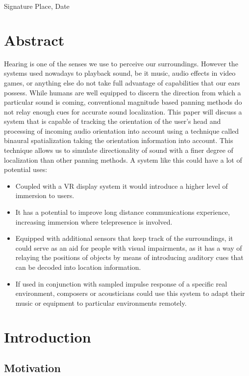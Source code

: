 \documentclass[a4paper,12pt,oneside]{article}
\begin{document}
\vspace{20mm}

Signature \hfill Place, Date

\newpage  
\section*{Abstract}
  
Hearing is one of the senses we use to perceive our surroundings. However the systems used nowadays to playback sound, be it music, audio effects in video games, or anything else do not take full advantage of capabilities that our ears possess. While humans are well equipped to discern the direction from which a particular sound is coming, conventional magnitude based panning methods do not relay enough cues for accurate sound localization. This paper will discuss a system that is capable of tracking the orientation of the user's head and processing of incoming audio  orientation into account using a technique called binaural spatialization taking the orientation information into account. This technique allows us to simulate directionality of sound with a finer degree of localization than other panning methods.  A system like this could have a lot of potential uses:
\begin{itemize}
\item Coupled with a VR display system it would introduce a higher level of immersion to users.
\item It has a potential to improve long distance communications experience, increasing immersion where telepresence is involved. 
\item Equipped with additional sensors that keep track of the surroundings, it could serve as an aid for people with visual impairments, as it has a way of relaying the positions of objects by means of introducing auditory cues that can be decoded into location information.
\item If used in conjunction with sampled impulse response of a specific real environment, composers or acousticians could use this system to adapt their music or equipment to particular environments remotely.
\end{itemize}

\newpage
  \tableofcontents


\newpage
\section{Introduction}
\subsection{Motivation}
\end{document}
